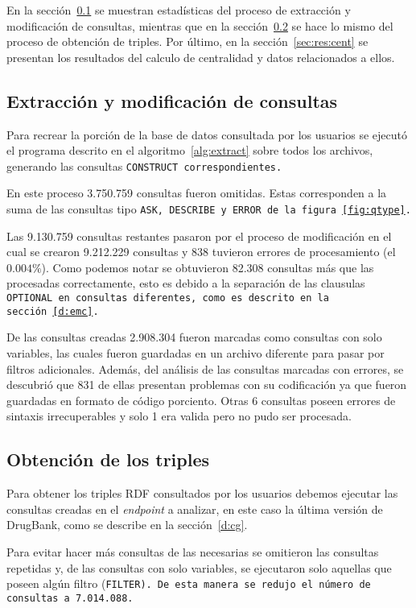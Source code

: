 En la sección~\ref{sec:res:extr} se muestran estadísticas del proceso de
extracción y modificación de consultas, mientras que en la
sección~\ref{sec:res:obt} se hace lo mismo del proceso de obtención de triples.
Por último, en la sección~\ref{sec:res:cent} se presentan los resultados del
calculo de centralidad y datos relacionados a ellos.

\subsection{Extracción y modificación de consultas}\label{sec:res:extr}
Para recrear la porción de la base de datos consultada por los usuarios se
ejecutó el programa descrito en el algoritmo~\ref{alg:extract} sobre todos los
archivos, generando las consultas \tt{CONSTRUCT} correspondientes.

En este proceso 3.750.759 consultas fueron omitidas. Estas corresponden a la
suma de las consultas tipo \tt{ASK}, \tt{DESCRIBE} y \tt{ERROR} de la
figura~\ref{fig:qtype}.

Las 9.130.759 consultas restantes pasaron por el proceso de modificación en el
cual se crearon 9.212.229 consultas y 838 tuvieron errores de procesamiento
(el $0.004\%$).
Como podemos notar se obtuvieron 82.308 consultas más que las procesadas
correctamente, esto es debido a la separación de las clausulas \tt{OPTIONAL} en
consultas diferentes, como es descrito en la sección~\ref{d:emc}.

De las consultas creadas 2.908.304 fueron marcadas como consultas con solo
variables, las cuales fueron guardadas en un archivo diferente para pasar por
filtros adicionales. 
Además, del análisis de las consultas marcadas con errores, se descubrió que
831 de ellas presentan problemas con su codificación ya que fueron guardadas en
formato de código porciento. Otras 6 consultas poseen errores de sintaxis
irrecuperables y solo 1 era valida pero no pudo ser procesada.

\subsection{Obtención de los triples}\label{sec:res:obt}
Para obtener los triples RDF consultados por los usuarios debemos ejecutar las
consultas creadas en el \emph{endpoint} a analizar, en este caso la última
versión de DrugBank, como se describe en la sección~\ref{d:cg}.

Para evitar hacer más consultas de las necesarias se omitieron las consultas
repetidas y, de las consultas con solo variables, se ejecutaron solo aquellas
que poseen algún filtro (\tt{FILTER}). De esta manera se redujo el número de
consultas a 7.014.088.

